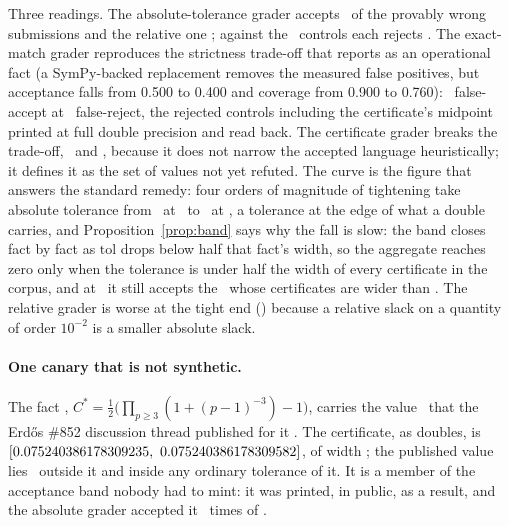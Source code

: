 \documentclass[11pt]{article}
\theoremstyle{definition}
\newcommand{\tol}{\mathrm{tol}}
\begin{document}
Three readings. The absolute-tolerance grader accepts \AbsFA\ of the provably wrong submissions and the relative one \RelFA; against the \Right\ controls each rejects \AbsFR. The exact-match grader reproduces the strictness trade-off that \cite{Ray26} reports as an operational fact (a SymPy-backed replacement removes the measured false positives, but acceptance falls from 0.500 to 0.400 and coverage from 0.900 to 0.760): \ExactFA\ false-accept at \ExactFR\ false-reject, the rejected controls including the certificate's midpoint printed at full double precision and read back. The certificate grader breaks the trade-off, \EnclFA\ and \EnclFR, because it does not narrow the accepted language heuristically; it defines it as the set of values not yet refuted. The curve is the figure that answers the standard remedy: four orders of magnitude of tightening take absolute tolerance from \AbsFAloose\ at \TolLoose\ to \AbsFAtight\ at \TolTight, a tolerance at the edge of what a double carries, and Proposition~\ref{prop:band} says why the fall is slow: the band closes fact by fact as $\tol$ drops below half that fact's width, so the aggregate reaches zero only when the tolerance is under half the width of every certificate in the corpus, and at \TolTight\ it still accepts the \AbsFAtight\ whose certificates are wider than \TwiceTolTight. The relative grader is worse at the tight end (\RelFAtight) because a relative slack on a quantity of order $10^{-2}$ is a smaller absolute slack.

\paragraph{One canary that is not synthetic.} The fact \texttt{\PubFactId}, $C^\ast=\tfrac12\bigl(\prod_{p\ge3}(1+(p-1)^{-3})-1\bigr)$, carries the value \PubValue\ that the Erd\H{o}s \#852 discussion thread published for it \cite{E852}. The certificate, as doubles, is $[0.075240386178309235,\ 0.075240386178309582]$, of width \PubWidth; the published value lies \PubGap\ outside it and inside any ordinary tolerance of it. It is a member of the acceptance band nobody had to mint: it was printed, in public, as a result, and the absolute grader accepted it \AbsFooledPublished\ times of \PublishedCanaries.
\end{document}
